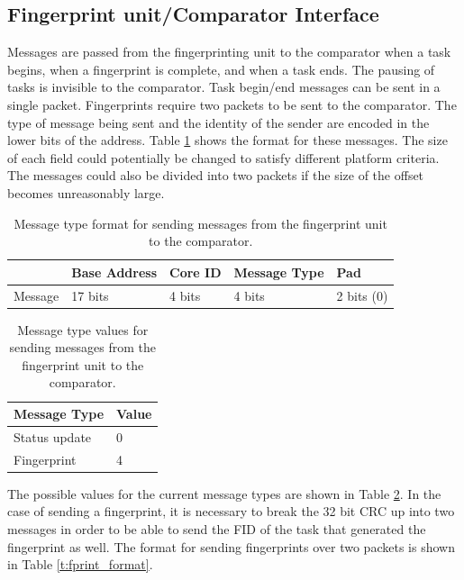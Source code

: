 
\subsection{Fingerprint unit/Comparator Interface}
Messages are passed from the fingerprinting unit to the comparator when a task begins, when a fingerprint is complete, and when a task ends. The pausing of tasks is invisible to the comparator. Task begin/end messages can be sent in a single packet. Fingerprints require two packets to be sent to the comparator. The type of message being sent and the identity of the sender are encoded in the lower bits of the address. Table \ref{t:msg_format} shows the format for these messages. The size of each field could potentially be changed to satisfy different platform criteria. The messages could also be divided into two packets if the size of the offset becomes unreasonably large.
\begin{table}[h]
\centering
    \begin{tabular}{| l | l | l | l | l | }
    \hline
     & Base Address & Core ID & Message Type & Pad\\ \hline
    Message & 17 bits & 4 bits & 4 bits & 2 bits (0)\\ \hline
    \end{tabular}
    \caption{Message type format for sending messages from the fingerprint unit to the comparator.}
    \label{t:msg_format}
\end{table}
\begin{table}[ht]
\centering
    \begin{tabular}{| l | l |}
    \hline
    Message Type & Value\\ \hline
    Status update & 0\\ \hline
    Fingerprint & 4\\ \hline
    \end{tabular}
    \caption{Message type values for sending messages from the fingerprint unit to the comparator.}
    \label{t:msg_types}
\end{table}

The possible values for the current message types are shown in Table \ref{t:msg_types}. In the case of sending a fingerprint, it is necessary to break the 32 bit CRC up into two messages in order to be able to send the FID of the task that generated the fingerprint as well.  The format for sending fingerprints over two packets is shown in Table \ref{t:fprint_format}.

